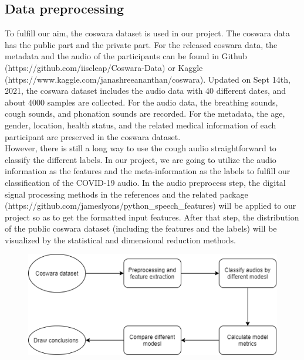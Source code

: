 \documentclass[11pt]{article}
\begin{document}
\subsection{Data preprocessing}
To fulfill our aim, the coswara dataset\cite{sharma2020coswara} is used in our project. The coswara data has the public part and the private part. For the released coswara data, the metadata and the audio of the participants can be found in Github (https://github.com/iiscleap/Coswara-Data) or Kaggle
(https://www.kaggle.com/janashreeananthan/coswara). Updated on Sept 14th, 2021, the coswara
dataset includes the audio data with 40 different dates, and about 4000 samples are collected.
For the audio data, the breathing sounds, cough sounds, and phonation sounds are recorded.
For the metadata, the age, gender, location, health status, and the related medical information of each participant are preserved in the coswara dataset.\\

\noindent
However, there is still a long way to use the cough audio straightforward to classify the different labels. In our project, we are going to utilize the audio information as the
features and the meta-information as the labels to fulfill our classification of the COVID-19
audio. In the audio preprocess step, the digital signal processing methods in the references\cite{mohammed2021ensemble} and the related package (https://github.com/jameslyons/python\_speech\_features) will be applied to our project so as to get the formatted input features. After that step, the distribution of the public coswara dataset (including the features and the labels) will be visualized by the statistical and dimensional reduction methods.  \\
\begin{figure}[htbp]
    \centering
    \includegraphics[width=.8\textwidth]{jiabao.png} %
    \label{fig_methyltech}
 \end{figure}
\end{document}

